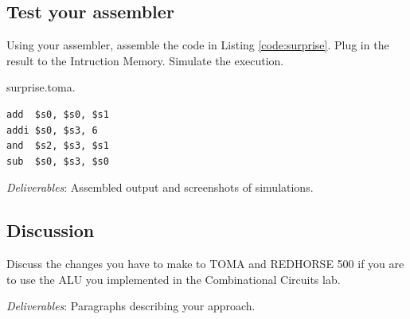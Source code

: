 \documentclass[a4paper, 11pt,oneside]{article}
\begin{document}
\subsection{Test your assembler}
Using your assembler, assemble the code in Listing \ref{code:surprise}. Plug in 
the result to the Intruction Memory. Simulate the execution.

\begin{listing}[H]
\caption{surprise.toma.}
\label{code:surprise}
\begin{verbatim}
add  $s0, $s0, $s1
addi $s0, $s3, 6 
and  $s2, $s3, $s1
sub  $s0, $s3, $s0
\end{verbatim}
\end{listing}

\textit{Deliverables}: Assembled output and screenshots of simulations.

\subsection{Discussion}
Discuss the changes you have to make to TOMA and REDHORSE 500 if you are to use 
the ALU you implemented in the Combinational Circuits lab. 

\textit{Deliverables}: Paragraphs describing your approach.










\nocite{*}
\end{document}
